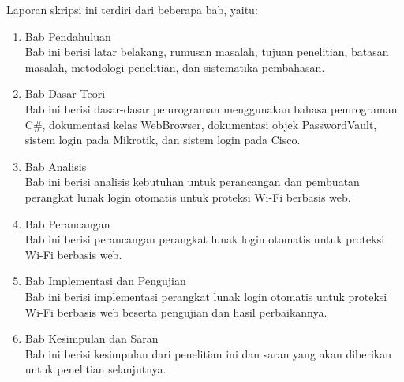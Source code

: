 Laporan skripsi ini terdiri dari beberapa bab, yaitu:

\begin{enumerate}
    \item{Bab Pendahuluan \\ Bab ini berisi latar belakang, rumusan masalah, tujuan penelitian, batasan masalah, metodologi penelitian, dan sistematika pembahasan.}
    \item{Bab Dasar Teori \\ Bab ini berisi dasar-dasar pemrograman menggunakan bahasa pemrograman C\#, dokumentasi kelas WebBrowser, dokumentasi objek PasswordVault, sistem login pada Mikrotik, dan sistem login pada Cisco.}
    \item{Bab Analisis \\ Bab ini berisi analisis kebutuhan untuk perancangan dan pembuatan perangkat lunak login otomatis untuk proteksi Wi-Fi berbasis web.}
    \item{Bab Perancangan \\ Bab ini berisi perancangan perangkat lunak login otomatis untuk proteksi Wi-Fi berbasis web.}
    \item{Bab Implementasi dan Pengujian \\ Bab ini berisi implementasi perangkat lunak login otomatis untuk proteksi Wi-Fi berbasis web beserta pengujian dan hasil perbaikannya.}
    \item{Bab Kesimpulan dan Saran \\ Bab ini berisi kesimpulan dari penelitian ini dan saran yang akan diberikan untuk penelitian selanjutnya.}
\end{enumerate}
